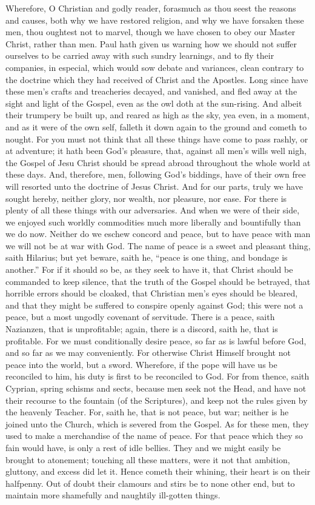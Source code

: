 Wherefore, O Christian and godly reader, forasmuch as thou seest
the reasons and causes, both why we have restored religion, and why
we have forsaken these men, thou oughtest not to marvel, though we have
chosen to obey our Master Christ, rather than men. Paul hath given
us warning how we should not suffer ourselves to be carried away with
such sundry learnings, and to fly their companies, in especial, which
would sow debate and
variances, clean contrary to the doctrine which they had received of
Christ and the Apostles. Long since have these men’s crafts
and treacheries decayed, and vanished, and fled away at the sight and
light of the Gospel, even as the owl doth at the sun-rising. And
albeit their trumpery be built up, and reared as high as the sky, yea
even, in a moment, and as it were of the own self, falleth it down again
to the ground and cometh to nought. For you must not think that
all these things have come to pass rashly, or at adventure; it hath
been God’s pleasure, that, against all men’s wills well
nigh, the Gospel of Jesu Christ should be spread abroad throughout the
whole world at these days. And, therefore, men, following God’s
biddings, have of their own free will resorted unto the doctrine of
Jesus Christ. And for our parts, truly we have sought hereby,
neither glory, nor wealth, nor pleasure, nor ease. For there is
plenty of all these things with our adversaries. And when we were
of their side, we enjoyed such worldly commodities much more liberally
and bountifully than we do now. Neither do we eschew concord and
peace, but to have peace with man we will not be at war with God.
The name of peace is a sweet and pleasant thing, saith Hilarius; but
yet beware, saith
he, “peace is one thing, and bondage is another.”
For if it should so be, as they seek to have it, that Christ should
be commanded to keep silence, that the truth of the Gospel should be
betrayed, that horrible errors should be cloaked, that Christian men’s
eyes should be bleared, and that they might be suffered to conspire
openly against God; this were not a peace, but a most ungodly covenant
of servitude. There is a peace, saith Nazianzen, that is unprofitable;
again, there is a discord, saith he, that is profitable. For we
must conditionally desire peace, so far as is lawful before God, and
so far as we may conveniently. For otherwise Christ Himself brought
not peace into the world, but a sword. Wherefore, if the pope
will have us be reconciled to him, his duty is first to be reconciled
to God. For from thence, saith Cyprian, spring schisms and sects,
because men seek not the Head, and have not their recourse to the fountain
(of the Scriptures), and keep not the rules given by the heavenly Teacher.
For, saith he, that is not peace, but war; neither is he joined unto
the Church, which is severed from the Gospel. As for these men,
they used to make a merchandise of the name of peace. For that
peace which they so fain would have, is only a
rest of idle bellies. They and we might easily be brought to atonement;
touching all these matters, were it not that ambition, gluttony, and
excess did let it. Hence cometh their whining, their heart is
on their halfpenny. Out of doubt their clamours and stirs be to
none other end, but to maintain more shamefully and naughtily ill-gotten
things.

